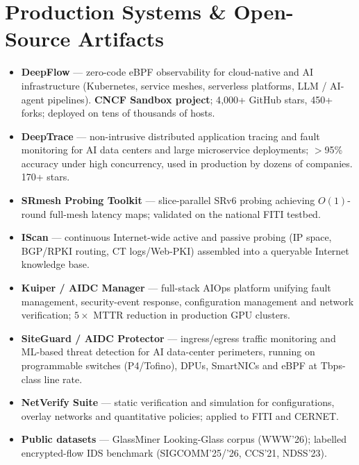 \documentclass[11pt]{article}
\begin{document}
\section{Production Systems \& Open-Source Artifacts}
\begin{itemize}
  \item \textbf{DeepFlow} --- zero-code eBPF observability for cloud-native and AI
        infrastructure (Kubernetes, service meshes, serverless platforms, LLM /
        AI-agent pipelines). \textbf{CNCF Sandbox project}; 4{,}000+ GitHub stars,
        450+ forks; deployed on tens of thousands of hosts. 
  \item \textbf{DeepTrace} --- non-intrusive distributed application tracing and fault
        monitoring for AI data centers and large microservice deployments; $>$95\%
        accuracy under high concurrency, used in production by dozens of companies.
        170+ stars. 
  \item \textbf{SRmesh Probing Toolkit} --- slice-parallel SRv6 probing achieving
        $O(1)$-round full-mesh latency maps; validated on the national FITI testbed.
  \item \textbf{IScan} --- continuous Internet-wide active and passive probing (IP
        space, BGP/RPKI routing, CT logs/Web-PKI) assembled into a queryable Internet
        knowledge base. 
  \item \textbf{Kuiper / AIDC Manager} --- full-stack AIOps platform unifying fault
        management, security-event response, configuration management and network
        verification; $5\times$ MTTR reduction in production GPU clusters.
  \item \textbf{SiteGuard / AIDC Protector} --- ingress/egress traffic monitoring and
        ML-based threat detection for AI data-center perimeters, running on
        programmable switches (P4/Tofino), DPUs, SmartNICs and eBPF at Tbps-class line
        rate. 
  \item \textbf{NetVerify Suite} --- static verification and simulation for
        configurations, overlay networks and quantitative policies; applied to FITI and
        CERNET. 
  \item \textbf{Public datasets} --- GlassMiner Looking-Glass corpus (WWW'26);
        labelled encrypted-flow IDS benchmark (SIGCOMM'25/'26, CCS'21, NDSS'23).
\end{itemize}
\end{document}
